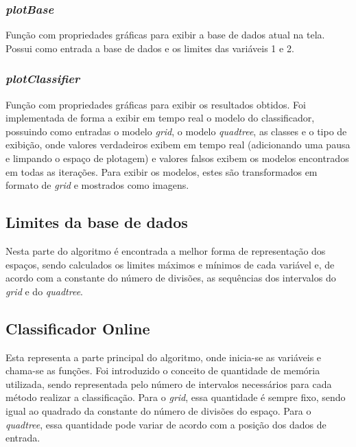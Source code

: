 \documentclass[conference]{IEEEtran}
\begin{document}
\subsubsection{\textit{plotBase}} \label{metod_26}

Função com propriedades gráficas para exibir a base de dados atual na tela. Possui como entrada a base de dados e os limites das variáveis 1 e 2.

\subsubsection{\textit{plotClassifier}} \label{metod_27}

Função com propriedades gráficas para exibir os resultados obtidos. Foi implementada de forma a exibir em tempo real o modelo do classificador, possuindo como entradas o modelo \textit{grid}, o modelo \textit{quadtree}, as classes e o tipo de exibição, onde valores verdadeiros exibem em tempo real (adicionando uma pausa e limpando o espaço de plotagem) e valores falsos exibem os modelos encontrados em todas as iterações. Para exibir os modelos, estes são transformados em formato de \textit{grid} e mostrados como imagens.



\subsection{Limites da base de dados} \label{metod_3}

Nesta parte do algoritmo é encontrada a melhor forma de representação dos espaços, sendo calculados os limites máximos e mínimos de cada variável e, de acordo com a constante do número de divisões, as sequências dos intervalos do \textit{grid} e do \textit{quadtree}.



\subsection{Classificador Online} \label{metod_4}

Esta representa a parte principal do algoritmo, onde inicia-se as variáveis e chama-se as funções. Foi introduzido o conceito de quantidade de memória utilizada, sendo representada pelo número de intervalos necessários para cada método realizar a classificação. Para o \textit{grid}, essa quantidade é sempre fixo, sendo igual ao quadrado da constante do número de divisões do espaço. Para o \textit{quadtree}, essa quantidade pode variar de acordo com a posição dos dados de entrada.
\end{document}
